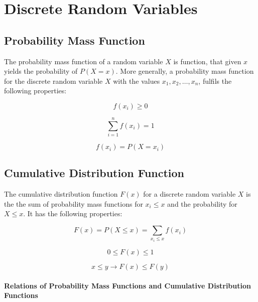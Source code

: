 \documentclass[12pt]{article}
\begin{document}
	\newpage
	\section{Discrete Random Variables}
	
	\subsection{Probability Mass Function}
	
	The probability mass function of a random variable \(X\) is function, that given \(x\) yields the probability of \(P(X=x)\). More generally, a probability mass function for the discrete random variable \(X\) with the values \(x_{1}, x_{2},\ldots ,x_{n}\), fulfils the following properties:
	
	\begin{equation*}
		f(x_{i})\geq 0
	\end{equation*}
	
	\begin{equation*}
		\sum_{i=1}^{n}f(x_{i})=1
	\end{equation*}
	
	\begin{equation*}
		f(x_{i})=P(X=x_{i})
	\end{equation*}
	
	\subsection{Cumulative Distribution Function}
	
	The cumulative distribution function \(F(x)\) for a discrete random variable \(X\) is the the sum of probability mass functions for \(x_{i}\leq x\) and the probability for \(X\leq x\). It has the following properties:
	
	\begin{equation*}
		F(x)=P(X\leq x)=\sum_{x_{i}\leq x}f(x_{i})
	\end{equation*}
	
	\begin{equation*}
		0\leq F(x)\leq 1
	\end{equation*}
	
	\begin{equation*}
		x\leq y \rightarrow F(x)\leq F(y)
	\end{equation*}
	
	\newpage
	\paragraph{Relations of Probability Mass Functions and Cumulative Distribution Functions}
	
\end{document}
